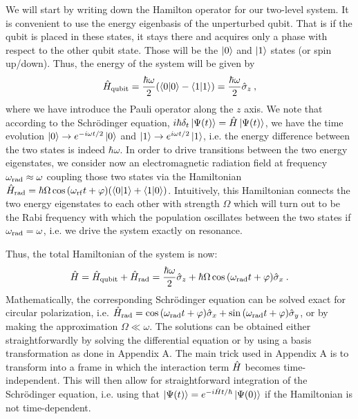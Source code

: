 \documentclass{../lab}
\begin{document}
We will start by writing down the Hamilton operator for our two-level system. It is convenient to use the energy eigenbasis of the unperturbed qubit. That is if the qubit is placed in these states, it stays there and acquires only a phase with respect to the other qubit state. Those will be the $\ket{0}$ and $\ket{1}$ states (or spin up/down). Thus, the energy of the system will be given by\begin{equation}
    \hat{H}_{\rm qubit}=\frac{\hbar \omega}{2} (\braket{0}{0}-\braket{1}{1}) = \frac{\hbar \omega}{2} \hat{\sigma}_z\:,
\end{equation}where we have introduce the Pauli operator along the $z$ axis.
We note that according to the  Schr\"odinger equation, $i\hbar\delta_t\ket{\Psi(t)}=\hat{H}\ket{\Psi(t)}$, we have the time evolution $\ket{0}\rightarrow e^{-i\omega t/2}\ket{0}$ and $\ket{1}\rightarrow e^{i\omega t/2}\ket{1}$, i.e. the energy difference between the two states is indeed $\hbar \omega$. In order to drive transitions between the two energy eigenstates, we consider now an electromagnetic radiation field at frequency $\omega_{\rm rad}\approx\omega$ coupling those two states via the Hamiltonian $\hat{H}_{\rm rad}=\hbar \Omega  \cos{(\omega_{\rm rf}t+\varphi)}(\braket{0}{1} + \braket{1}{0})$. Intuitively, this Hamiltonian connects the two energy eigenstates to each other with strength $\Omega$ which will turn out to be the Rabi frequency with which the population oscillates between the two states if $\omega_{\rm rad}=\omega$, i.e. we drive the system exactly on resonance. 

Thus, the total Hamiltonian of the system is now: 
\begin{equation}
    \hat{H}=\hat{H}_{\rm qubit}+\hat{H}_{\rm rad}=\frac{\hbar \omega}{2} \hat{\sigma}_z + {\hbar \Omega}\cos{(\omega_{\rm rad}t+\varphi)} \hat{\sigma}_x\:.
\end{equation}
Mathematically, the corresponding Schr\"odinger equation can be solved exact for circular polarization, i.e. $\hat{H}_{\rm rad}=\cos{(\omega_{\rm rad}t+\varphi)} \hat{\sigma}_x + \sin{(\omega_{\rm rad}t+\varphi)} \hat{\sigma}_y$, or by making the approximation $\Omega\ll \omega$. The solutions can be obtained either straightforwardly by solving the differential equation or by using a basis transformation as done in Appendix A. The main trick used in Appendix A is to transform into a frame in which the interaction term $\hat{H}_{\rm}$ becomes time-independent. This will then allow for straightforward integration of the Schr\"odinger equation, i.e. using that $\ket{\Psi(t)}=e^{-i\hat{H}t/\hbar}\ket{\Psi(0)}$ if the Hamiltonian is not time-dependent. 
\end{document}
